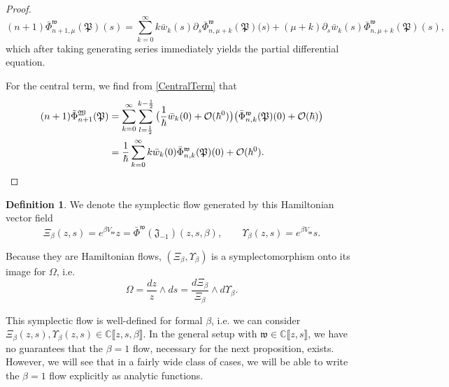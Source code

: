 \documentclass[10pt,a4paper,oneside,no-math,reqno]{amsart}%
\theoremstyle{plain}
\theoremstyle{definition}
\newtheorem{definition}[theorem]{Definition}
\theoremstyle{remark}
\numberwithin{equation}{section}
\newcommand{\mb}[1]{\mathbb{#1}}
\newcommand{\mf}[1]{\mathfrak{#1}}
\newcommand{\mc}[1]{\mathcal{#1}}
\newcommand{\1}{\mathds{1}}
\newcommand{\C}{\mb{C}}
\newcommand{\<}{\langle}
\renewcommand{\>}{\rangle}
\newcommand{\del}{\partial}
\begin{document}
\begin{proof}
\begin{equation}
		(n+1) \bar{\Phi}^{\mf{w}}_{n+1,\mu} (\mf{P}) (s) 
		=
		\sum_{k = 0}^\infty k \bar{w}_k ( s ) \del_s \bar{\Phi}^{\mf{w}}_{n,\mu+k} (\mf{P}) \big( s \big) + (\mu + k) \del_s \bar{w}_k (s ) \bar{\Phi}^{\mf{w}}_{n, \mu+k} (\mf{P}) ( s ) ,
	\end{equation}
	which after taking generating series immediately yields the partial differential equation.\par
    For the central term, we find from \cref{CentralTerm} that
    \begin{equation}
        \begin{split}
            (n+1) \tilde{\Phi}^{\mf{W}}_{n+1} (\mf{P})
            &=
            \sum_{k=0}^\infty \sum_{ l = \frac{1}{2}}^{k - \frac{1}{2}} \big( \frac{1}{\hbar} \bar{w}_k (0 ) + \mc{O} (\hbar^0) \big) \big( \bar{\Phi}^{\mf{w}}_{n,k} (\mf{P}) ( 0) + \mc{O} (\hbar) \big)
            \\
            &=
            \frac{1}{\hbar} \sum_{k=0}^\infty k \bar{w}_k (0) \bar{\Phi}^{\mf{w}}_{n,k} (\mf{P}) (0) + \mc{O} (\hbar^0).\qedhere
        \end{split}
    \end{equation}
\end{proof}


\begin{definition}\label{DefSymplectomorphism}
	We denote the symplectic flow generated by this Hamiltonian vector field
	\begin{equation}
		\Xi_\beta (z,s)
		= 
		e^{\beta V_\mf{w}} z 
		=
		\bar{\Phi}^{\mf{w}}(\mf{J}_{-1}) (z,s,\beta),
		\qquad
		\Upsilon_\beta (z,s)
		=
		e^{\beta V_\mf{w}} s .
	\end{equation}
\end{definition}

Because they are Hamiltonian flows, $ (\Xi_\beta ,\Upsilon_\beta )$ is a symplectomorphism onto its image for $ \Omega$, i.e. 
\begin{equation}
	\Omega 
    =
    \frac{dz}{z} \wedge ds
    =
    \frac{d\Xi_\beta}{\Xi_\beta} \wedge d\Upsilon_\beta .
\end{equation}

This symplectic flow is well-defined for formal $ \beta$, i.e. we can consider $ \Xi_\beta (z,s) , \Upsilon_\beta (z,s) \in \C \llbracket z, s, \beta \rrbracket$. In the general setup with $ \mf{w} \in \C \llbracket z, s\rrbracket $, we have no guarantees that the $ \beta = 1$ flow, necessary for the next proposition, exists. However, we will see that in a fairly wide class of cases, we will be able to write the $ \beta = 1$ flow explicitly as analytic functions.
\end{document}
